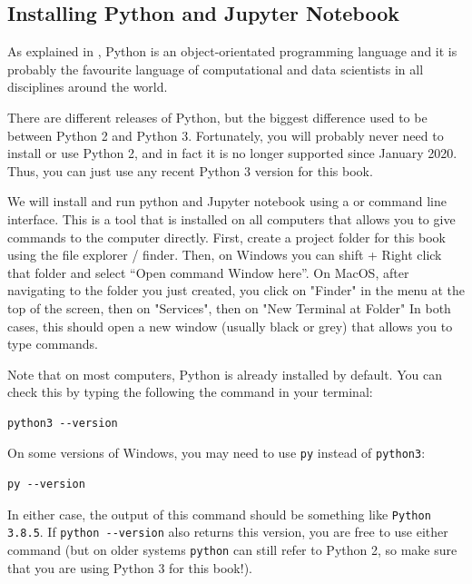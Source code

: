 \subsection{Installing Python and Jupyter Notebook}

As explained in , Python is an object-orientated programming language
and it is probably the favourite language of computational and data
scientists in all disciplines around the world.

There are different releases of Python, but the biggest difference used to be between Python 2 and Python 3.
Fortunately, you will probably never need to install or use Python 2, and in fact it is no longer supported since January 2020.
Thus, you can just use any recent Python 3 version for this book.

We will install and run python and Jupyter notebook using a  or command line interface.
This is a tool that is installed on all computers that allows you to give commands to the computer directly.
First, create a project folder for this book using the file explorer / finder.
Then, on Windows you can shift + Right click that folder and select ``Open command Window here''.
On MacOS, after navigating to the folder you just created, you click on "Finder" in the menu at the top of the screen, then on "Services", then on "New Terminal at Folder"
In both cases, this should open a new window (usually black or grey) that allows you to type commands.

Note that on most computers, Python is already installed by default.
You can check this by typing the following the command in your terminal:

\begin{verbatim}
python3 --version
\end{verbatim}

On some versions of Windows, you may need to use \verb|py| instead of \verb|python3|:
\begin{verbatim}
py --version
\end{verbatim}

In either case, the output of this command should be something like \verb|Python 3.8.5|.
If \verb|python --version| also returns this version, you are free to use either command
(but on older systems \verb|python| can still refer to Python 2, so make sure that you are using Python 3 for this book!).

